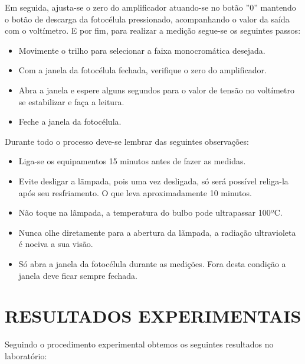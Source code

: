 \documentclass[10pt,twocolumn,letterpaper]{article}
\begin{document}
\vspace{.25cm}

\hspace{1cm} Em seguida, ajusta-se o zero do amplificador atuando-se no botão ”0” mantendo o botão de descarga da fotocélula pressionado, acompanhando o valor da saída com o voltímetro. E por fim, para realizar a medição segue-se os seguintes passos: 

\begin{itemize}
    \item Movimente o trilho para selecionar a faixa monocromática desejada. \item Com a janela da fotocélula fechada, verifique o zero do amplificador. 
    \item Abra a janela e espere alguns segundos para o valor de tensão no voltímetro se estabilizar e faça a leitura. 
    \item Feche a janela da fotocélula. 
\end{itemize}

\hspace{1cm} Durante todo o processo deve-se lembrar das seguintes
observações:

\begin{itemize}
    \item Liga-se os equipamentos 15 minutos antes de fazer as medidas. 
    \item Evite desligar a lãmpada, pois uma vez desligada, só será possível religa-la após seu resfriamento. O que leva aproximadamente 10 minutos. 
    \item Não toque na lãmpada, a temperatura do bulbo pode ultrapassar 100ºC. 
    \item Nunca olhe diretamente para a abertura da lãmpada, a radiação ultravioleta é nociva a sua visão. 
    \item Só abra a janela da fotocélula durante as medições. Fora desta condição a janela deve ficar sempre fechada. 
\end{itemize}


\section{RESULTADOS EXPERIMENTAIS}
\hspace{1cm} Seguindo o procedimento experimental obtemos os seguintes resultados no laboratório:

\vspace{-.25cm}
\end{document}

